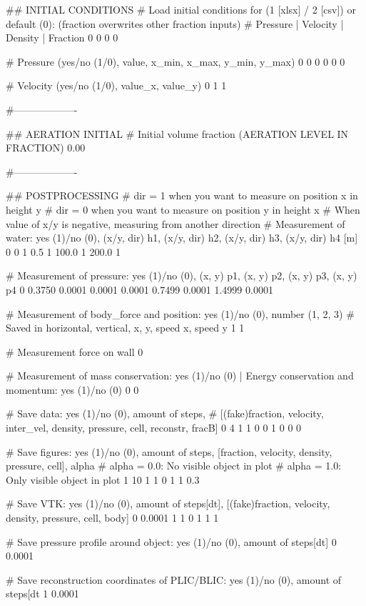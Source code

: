 ## INITIAL CONDITIONS
# Load initial conditions for (1 [xlsx] / 2 [csv]) or default (0): (fraction overwrites other fraction inputs)
# Pressure 		| Velocity		| Density		| Fraction
0   0   0   0

# Pressure (yes/no (1/0), value, x_min, x_max, y_min, y_max)
0 0 0 0 0 0

# Velocity (yes/no (1/0), value_x, value_y)
0 1 1

#-------------------

## AERATION INITIAL
# Initial volume fraction (AERATION LEVEL IN FRACTION)
0.00

#-------------------

## POSTPROCESSING
# dir = 1 when you want to measure on position x in height y
# dir = 0 when you want to measure on position y in height x
# When value of x/y is negative, measuring from another direction
# Measurement of water: yes (1)/no (0), (x/y, dir) h1, (x/y, dir) h2, (x/y, dir) h3, (x/y, dir) h4 [m]
0   0 1  0.5 1  100.0 1  200.0 1

# Measurement of pressure: yes (1)/no (0), (x, y) p1, (x, y) p2, (x, y) p3, (x, y) p4
0	0.3750 0.0001	0.0001 0.0001	0.7499 0.0001     1.4999 0.0001

# Measurement of body_force and position: yes (1)/no (0), number (1, 2, 3)
# Saved in horizontal, vertical, x, y, speed x, speed y
1 1

# Measurement force on wall
0

# Measurement of mass conservation: yes (1)/no (0) | Energy conservation and momentum: yes (1)/no (0)
0 0

# Save data: yes (1)/no (0), amount of steps,
# [(fake)fraction, velocity, inter_vel, density, pressure, cell, reconstr, fracB]
0	4	1 1 0 0 1 0 0 0

# Save figures: yes (1)/no (0), amount of steps, [fraction, velocity, density, pressure, cell], alpha
# alpha = 0.0: No visible object in plot
# alpha = 1.0: Only visible object in plot
1 	10	1 1 0 1 1	0.3

# Save VTK: yes (1)/no (0), amount of steps[dt], [(fake)fraction, velocity, density, pressure, cell, body]
0	0.0001	1 1 0 1 1 1

# Save pressure profile around object: yes (1)/no (0), amount of steps[dt]
0  0.0001

# Save reconstruction coordinates of PLIC/BLIC: yes (1)/no (0), amount of steps[dt
1 0.0001
